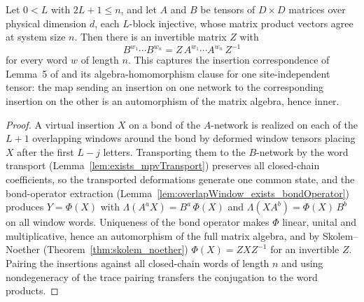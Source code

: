 \begin{lemma}%
    \label{lem:exists_conjugation_of_mpv_eq}
    \leanok
    Let $0 < L$ with $2L + 1 \le n$, and let $A$ and $B$ be tensors of
    $D \times D$ matrices over physical dimension $d$, each $L$-block
    injective, whose matrix product vectors agree at system size $n$.
    Then there is an invertible matrix $Z$ with
    \[
        B^{w_1} \cdots B^{w_n} = Z\, A^{w_1} \cdots A^{w_n}\, Z^{-1}
    \]
    for every word $w$ of length $n$.  This captures the insertion
    correspondence of Lemma~5 of \cite{Molnar2018NormalPEPS} and its
    algebra-homomorphism clause for one site-independent tensor: the map
    sending an insertion on one network to the corresponding insertion on
    the other is an automorphism of the matrix algebra, hence inner.
\end{lemma}
\begin{proof}\leanok
    A virtual insertion $X$ on a bond of the $A$-network is realized on
    each of the $L + 1$ overlapping windows around the bond by deformed
    window tensors placing $X$ after the first $L - j$ letters.
    Transporting them to the $B$-network by the word transport
    (Lemma~\ref{lem:exists_mpvTransport}) preserves all closed-chain
    coefficients, so the transported deformations generate one common
    state, and the bond-operator extraction
    (Lemma~\ref{lem:overlapWindow_exists_bondOperator}) produces
    $Y = \Phi(X)$ with $\Lambda(A^{a} X) = B^{a}\,\Phi(X)$ and
    $\Lambda(X A^{b}) = \Phi(X)\,B^{b}$ on all window words.  Uniqueness
    of the bond operator makes $\Phi$ linear, unital and multiplicative,
    hence an automorphism of the full matrix algebra, and by
    Skolem--Noether (Theorem~\ref{thm:skolem_noether})
    $\Phi(X) = Z X Z^{-1}$ for an invertible $Z$.  Pairing the insertions
    against all closed-chain words of length $n$ and using nondegeneracy of
    the trace pairing transfers the conjugation to the word products.
\end{proof}

